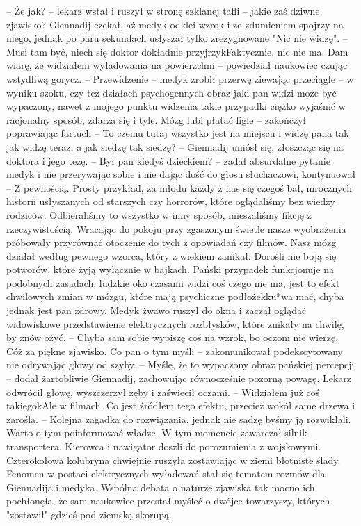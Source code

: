 \documentclass[../MAIN.tex]{subfiles}
\begin{document}
-- Że jak? -- lekarz wstał i ruszył w stronę szklanej tafli -- jakie zaś dziwne zjawisko? 
Giennadij czekał, aż medyk odklei wzrok i ze zdumieniem spojrzy na niego, jednak po paru sekundach usłyszał tylko zrezygnowane "Nic nie widzę". 
-- Musi tam być, niech się doktor dokładnie przyjrzy\3kFaktycznie, nic nie ma. Dam wiarę, że widziałem wyładowania na powierzchni -- powiedział naukowiec czując wstydliwą gorycz. 
-- Przewidzenie -- medyk zrobił przerwę ziewając przeciągle -- w wyniku szoku, czy też działach psychogennych obraz jaki pan widzi może być wypaczony, nawet z mojego punktu widzenia takie przypadki ciężko wyjaśnić w racjonalny sposób, zdarza się i tyle. Mózg lubi płatać figle -- zakończył poprawiając fartuch 
-- To czemu tutaj wszystko jest na miejscu i widzę pana tak jak widzę teraz, a jak siedzę tak siedzę? -- Giennadij uniósł się, złoszcząc się na doktora i jego tezę. 
-- Był pan kiedyś dzieckiem? -- zadał absurdalne pytanie medyk i nie przerywając sobie i nie dając dość do głosu słuchaczowi, kontynuował -- Z pewnością. Prosty przykład, za młodu każdy z nas się czegoś bał, mrocznych historii usłyszanych od starszych czy horrorów, które oglądaliśmy bez wiedzy rodziców. Odbieraliśmy to wszystko w inny sposób, mieszaliśmy fikcję z rzeczywistością. Wracając do pokoju przy zgaszonym świetle nasze wyobrażenia próbowały przyrównać otoczenie do tych z opowiadań czy filmów. Nasz mózg działał według pewnego wzorca, który z wiekiem zanikał. Dorośli nie boją się potworów, które żyją wyłącznie w bajkach. Pański przypadek funkcjonuje na podobnych zasadach, ludzkie oko czasami widzi coś czego nie ma, jest to efekt chwilowych zmian w mózgu, które mają psychiczne podłoże\3kku*wa mać, chyba jednak jest pan zdrowy. 
Medyk żwawo ruszył do okna i zaczął oglądać widowiskowe przedstawienie elektrycznych rozbłysków, które znikały na chwilę, by znów ożyć. 
-- Chyba sam sobie wypiszę coś na wzrok, bo oczom nie wierzę. Cóż za piękne zjawisko. Co pan o tym myśli -- zakomunikował podekscytowany nie odrywając głowy od szyby. 
-- Myślę, że to wypaczony obraz pańskiej percepcji -- dodał żartobliwie Giennadij, zachowując równocześnie pozorną powagę. 
Lekarz odwrócił głowę, wyszczerzył zęby i zaświecił oczami. 
-- Widziałem już coś takiego\3kAle w filmach. Co jest źródłem tego efektu, przecież wokół same drzewa i zarośla. 
-- Kolejna zagadka do rozwiązania, jednak nie sądzę byśmy ją rozwikłali. Warto o tym poinformować władze.
W tym momencie zawarczał silnik transportera. Kierowca i nawigator doszli do porozumienia z wojskowymi. Czterokołowa kolubryna chwiejnie ruszyła zostawiając w ziemi błotniste ślady. Fenomen w postaci elektrycznych wyładowań stał się tematem rozmów dla Giennadija i medyka. Wspólna debata o naturze zjawiska tak mocno ich pochłonęła, że sam naukowiec przestał myśleć o dwójce towarzyszy, których "zostawił" gdzieś pod ziemską skorupą.
\end{document}
